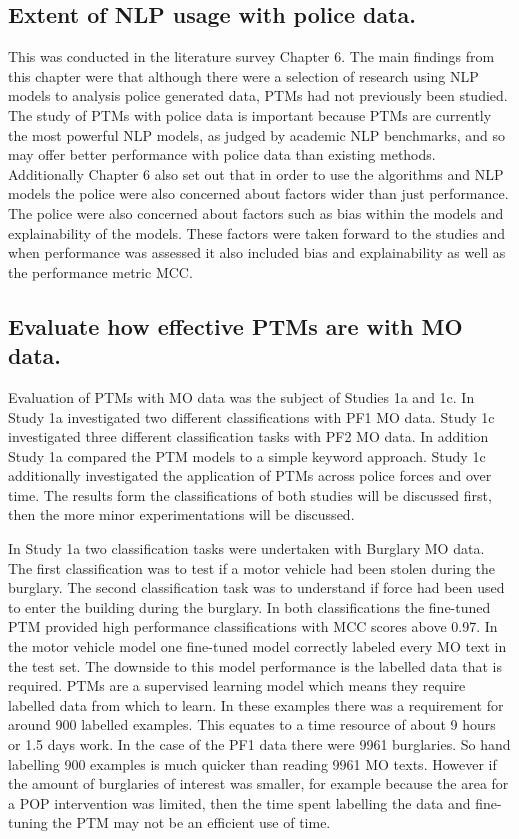 \subsection{Extent of NLP usage with police data.} This was conducted in the literature survey Chapter 6. The main findings from this chapter were that although there were a selection of research using NLP models to analysis police generated data, PTMs had not previously been studied. The study of PTMs with police data is important because PTMs are currently the most powerful NLP models, as judged by academic NLP benchmarks, and so may offer better performance with police data than existing methods. Additionally Chapter 6 also set out that in order to use the algorithms and NLP models the police were also concerned about factors wider than just performance. The police were also concerned about factors such as bias within the models and explainability of the models. These  factors were taken forward to the studies and when performance was assessed it also included bias and explainability as well as the performance metric MCC.

\subsection{Evaluate how effective PTMs are with MO data.} Evaluation of PTMs with MO data was the subject of Studies 1a and 1c. In Study 1a investigated two different classifications with PF1 MO data. Study 1c investigated three different classification tasks with PF2 MO data. In addition Study 1a compared the PTM models to a simple keyword approach. Study 1c additionally investigated the application of PTMs across police forces and over time. The results form the classifications of both studies will be discussed first, then the more minor experimentations will be discussed.

In Study 1a two classification tasks were undertaken with Burglary MO data. The first classification was to test if a motor vehicle had been stolen during the burglary. The second classification task was to understand if force had been used to enter the building during the burglary. In both classifications the fine-tuned PTM provided high performance classifications with MCC scores above 0.97. In the motor vehicle model one fine-tuned model correctly labeled every MO text in the test set.  The downside to this model performance is the labelled data that is required. PTMs are a supervised learning model which means they require labelled data from which to learn. In these examples there was a requirement for around 900 labelled examples. This equates to a time resource of about 9 hours or 1.5 days work.  In the case of the PF1 data there were 9961 burglaries. So hand labelling 900 examples is much quicker than reading 9961 MO texts. However if the amount of burglaries of interest was smaller, for example because the area for a POP intervention was limited, then the time spent labelling the data and fine-tuning the PTM may not be an efficient use of time.


